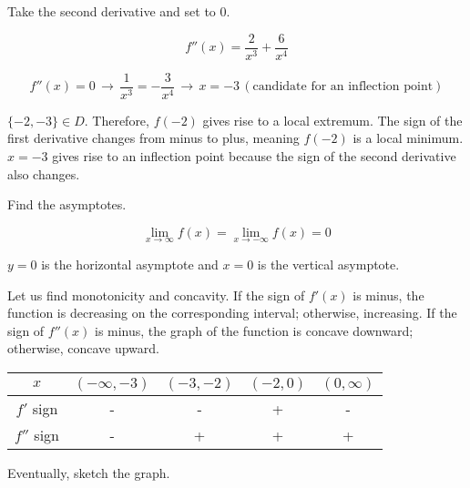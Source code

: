 \documentclass{article}
\begin{document}
\hfill

\noindent Take the second derivative and set to 0.

\[f''(x) = \frac{2}{x^3} + \frac{6}{x^4}\]

\[f''(x) = 0\,\rightarrow\,\frac{1}{x^3} = -\frac{3}{x^4}\,\rightarrow\,x = -3\, (\text{candidate for an inflection point})\]

\hfill

\noindent  $\{-2, -3\} \in D$. Therefore, $f(-2)$ gives rise to a local extremum. The sign of the first derivative changes from minus to plus, meaning $f(-2)$ is a local minimum. $x=-3$ gives rise to an inflection point because the sign of the second derivative also changes.

\hfill

\noindent Find the asymptotes.

\[\lim_{x\to\infty} f(x) = \lim_{x\to-\infty} f(x) = 0\]

\hfill

\noindent $y=0$ is the horizontal asymptote and $x=0$ is the vertical asymptote.

\hfill

\noindent Let us find monotonicity and concavity. If the sign of $f'(x)$ is minus, the function is decreasing on the corresponding interval; otherwise, increasing. If the sign of $f''(x)$ is minus, the graph of the function is concave downward; otherwise, concave upward.

\begin{center}
    \large
    \begin{tabular}{ |c| c c c c| } 
    \hline
        $x$ & $(-\infty, -3)$ & $(-3, -2)$ & $(-2, 0)$ &  $(0, \infty)$ \\
        \hline
        $f'$ sign & - & - & + & - \\
        \hline
        $f''$ sign & - & + & + & + \\
        \hline
    \end{tabular}
\end{center}

\hfill

\noindent Eventually, sketch the graph.

\begin{center}
\end{center}
\end{document}
